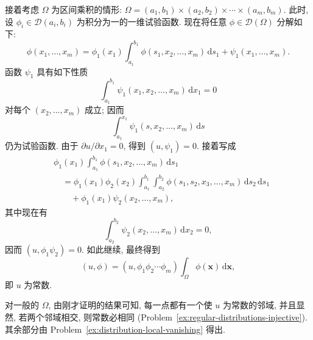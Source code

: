 \begin{Proof}
接着考虑 $\Omega$ 为区间乘积的情形: $\Omega=(a_1,b_1)\times(a_2,b_2)\times\cdots\times(a_m,b_m)$. 此时, 设 $\phi_i\in\mathcal{D}(a_i,b_i)$ 为积分为一的一维试验函数. 现在将任意 $\phi\in\mathcal{D}(\Omega)$ 分解如下:
\begin{equation}\label{eq:test-function-product-domain-first-decomposition}
\phi(x_1,\ldots,x_m)=\phi_1(x_1)\int_{a_1}^{b_1}\phi(s_1,x_2,\ldots,x_m)\,\mathrm{d}s_1+\psi_1(x_1,\ldots,x_m).
\end{equation}
函数 $\psi_1$ 具有如下性质
\begin{equation}\label{eq:test-function-first-remainder-zero-integral}
\int_{a_1}^{b_1}\psi_1(x_1,x_2,\ldots,x_m)\,\mathrm{d}x_1=0
\end{equation}
对每个 $(x_2,\ldots,x_m)$ 成立; 因而
\begin{equation}\label{eq:test-function-first-remainder-primitive}
\int_{a_1}^{x_1}\psi_1(s,x_2,\ldots,x_m)\,\mathrm{d}s
\end{equation}
仍为试验函数. 由于 $\partial u/\partial x_1=0$, 得到 $(u,\psi_1)=0$. 接着写成
\begin{equation}\label{eq:test-function-product-domain-second-decomposition}
\begin{aligned}
&\phi_1(x_1)\int_{a_1}^{b_1}\phi(s_1,x_2,\ldots,x_m)\,\mathrm{d}s_1\\
&\quad=\phi_1(x_1)\phi_2(x_2)\int_{a_1}^{b_1}\int_{a_2}^{b_2}\phi(s_1,s_2,x_3,\ldots,x_m)\,\mathrm{d}s_2\,\mathrm{d}s_1\\
&\qquad+\phi_1(x_1)\psi_2(x_2,\ldots,x_m),
\end{aligned}
\end{equation}
其中现在有
\begin{equation}\label{eq:test-function-second-remainder-zero-integral}
\int_{a_2}^{b_2}\psi_2(x_2,\ldots,x_m)\,\mathrm{d}x_2=0,
\end{equation}
因而 $(u,\phi_1\psi_2)=0$. 如此继续, 最终得到
\begin{equation}\label{eq:zero-gradient-distribution-product-pairing}
(u,\phi)=(u,\phi_1\phi_2\cdots\phi_m)\int_\Omega\phi(\bm{x})\,\mathrm{d}\bm{x},
\end{equation}
即 $u$ 为常数.

对一般的 $\Omega$, 由刚才证明的结果可知, 每一点都有一个使 $u$ 为常数的邻域, 并且显然, 若两个邻域相交, 则常数必相同 (Problem~\ref{ex:regular-distributions-injective}). 其余部分由 Problem~\ref{ex:distribution-local-vanishing} 得出.
\end{Proof}
